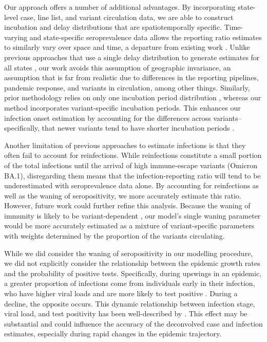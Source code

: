 Our approach offers a number of additional advantages.
By incorporating state-level 
case, line list, and variant circulation data, we are able to construct incubation and
delay distributions that are spatiotemporally specific. Time-varying and
state-specific seroprevalence data allows the reporting ratio estimates to
similarly vary over space and time, a departure from existing work
\citep{unwin2020state, uga2020covid19}. Unlike previous approaches that use a
single delay distribution to generate estimates for all states
\citep{chitwood2022reconstructing, jahja2022real, miller2022statistical}, our
work avoids this assumption of geographic invariance, an assumption that is far
from realistic due to differences in the reporting pipelines, pandemic response,
and variants in circulation, among other things. Similarly, prior methodology
relies on only one incubation period distribution \citep{miller2022statistical},
whereas our method incorporates variant-specific incubation periods. This
enhances our infection onset estimation by accounting for the differences across
variants--specifically, that newer variants tend to have shorter incubation
periods \citep{tanaka2022shorter, ogata2022shorter, wu2022incubation}.

Another limitation of previous approaches to estimate infections is that they
often fail to account for reinfections. While reinfections constitute a small
portion of the total infections until the arrival of high immune-escape variants
(Omicron BA.1), disregarding them means that the infection-reporting ratio will tend to
be underestimated with seroprevalence data alone. By accounting for reinfections
as well as the waning of seropositivity, we more accurately estimate this ratio.
However, future work could further refine this analysis. Because the waning of immunity
is likely to be variant-dependent \citep{pooley2023durability}, our model's
single waning parameter would be more accurately estimated as a mixture of
variant-specific parameters with weights determined by the proportion of the
variants circulating. 

While we did consider the waning of seropositivity in our modelling procedure, we did 
not explicitly consider the relationship between the epidemic growth rates and the 
probability of positive tests. Specifically, during upswings in 
an epidemic, a greater proportion of infections come from individuals early in their 
infection, who have higher viral loads and are more likely to test positive \citep{frediani2024new}. During a 
decline, the opposite occurs. This dynamic relationship between infection 
stage, viral load, and test positivity has been well-described by 
\citet{hay2021estimating}. This effect may be substantial and 
could influence the accuracy of the deconvolved case and infection estimates, 
especially during rapid changes in the epidemic trajectory. 

